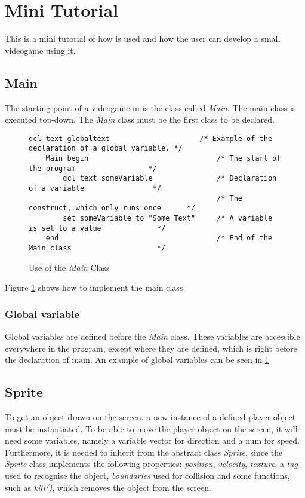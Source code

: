 \section{Mini Tutorial}
This is a mini tutorial of how \lang{} is used and how the user can develop a small videogame using it. 

\subsection{Main}
The starting point of a videogame in \lang{} is the class called \textit{Main}. The main class is executed top-down. The \textit{Main} class must be the first class to be declared.


\begin{figure}[H]
    \centering
    
    \begin{lstlisting}[style=gglang]
    dcl text globaltext                     /* Example of the declaration of a global variable. */
    Main begin                              /* The start of the program                 */
        dcl text someVariable               /* Declaration of a variable                */
                                            /* The construct, which only runs once      */
        set someVariable to "Some Text"     /* A variable is set to a value             */
    end                                     /* End of the Main class                    */
    \end{lstlisting}
    \caption{Use of the \textit{Main} Class\label{fig:main}}
\end{figure}

Figure \ref{fig:main} shows how to implement the main class.

\subsubsection{Global variable}
Global variables are defined before the \textit{Main} class. These variables are accessible everywhere in the program, except where they are defined, which is right before the declaration of main. An example of global variables can be seen in \ref{fig:main}

\subsection{Sprite}
To get an object drawn on the screen, a new instance of a defined player object must be instantiated. To be able to move the player object on the screen, it will need some variables, namely a variable vector for direction and a num for speed. Furthermore, it is needed to inherit from the abstract class \textit{Sprite}, since the \textit{Sprite} class implements the following properties: \textit{position}, \textit{velocity}, \textit{texture}, a \textit{tag} used to recognise the object, \textit{boundaries} used for collision and some functions, such as \textit{kill()}, which removes the object from the screen.

